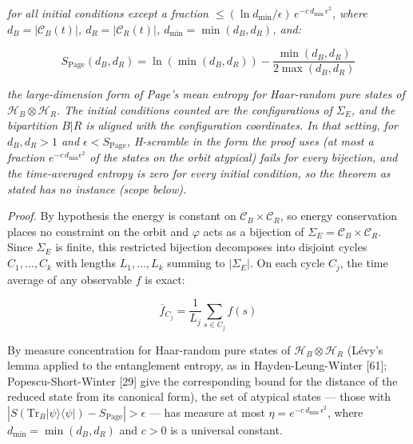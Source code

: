 \documentclass[
]{article}
\begin{document}
\emph{for all initial conditions except a fraction
\(\leq (\ln d_{\min}/\epsilon)\,e^{-c \, d_{\min} \, \epsilon^2}\),
where \(d_B = |\mathcal{C}_B(t)|\), \(d_R = |\mathcal{C}_R(t)|\),
\(d_{\min} = \min(d_B, d_R)\), and:}

\[S_{\text{Page}}(d_B, d_R) = \ln(\min(d_B, d_R)) - \frac{\min(d_B, d_R)}{2\max(d_B, d_R)}\]

\emph{the large-dimension form of Page's mean entropy for Haar-random
pure states of \(\mathcal{H}_B \otimes \mathcal{H}_R\). The initial
conditions counted are the configurations of \(\Sigma_E\), and the
bipartition \(B|R\) is aligned with the configuration coordinates. In
that setting, for \(d_B, d_R > 1\) and \(\epsilon < S_{\text{Page}}\),
H-scramble in the form the proof uses (at most a fraction
\(e^{-c\,d_{\min}\epsilon^2}\) of the states on the orbit atypical)
fails for every bijection, and the time-averaged entropy is zero for
every initial condition, so the theorem as stated has no instance (scope
below).}

\emph{Proof.} By hypothesis the energy is constant on
\(\mathcal{C}_B \times \mathcal{C}_R\), so energy conservation places no
constraint on the orbit and \(\varphi\) acts as a bijection of
\(\Sigma_E = \mathcal{C}_B \times \mathcal{C}_R\). Since \(\Sigma_E\) is
finite, this restricted bijection decomposes into disjoint cycles
\(C_1, \ldots, C_k\) with lengths \(L_1, \ldots, L_k\) summing to
\(|\Sigma_E|\). On each cycle \(C_j\), the time average of any
observable \(f\) is exact:

\[\overline{f}_{C_j} = \frac{1}{L_j} \sum_{s \in C_j} f(s)\]

By measure concentration for Haar-random pure states of
\(\mathcal{H}_B \otimes \mathcal{H}_R\) (Lévy's lemma applied to the
entanglement entropy, as in Hayden-Leung-Winter {[}61{]};
Popescu-Short-Winter {[}29{]} give the corresponding bound for the
distance of the reduced state from its canonical form), the set of
atypical states --- those with
\(|S(\text{Tr}_B |\psi\rangle\langle\psi|) - S_{\text{Page}}| > \epsilon\)
--- has measure at most \(\eta = e^{-c \, d_{\min} \, \epsilon^2}\),
where \(d_{\min} = \min(d_B, d_R)\) and \(c > 0\) is a universal
constant.
\end{document}
